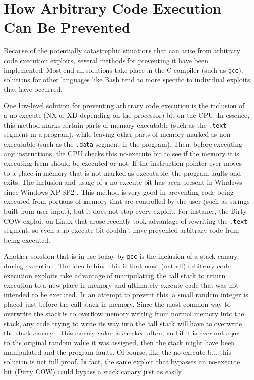 \section{How Arbitrary Code Execution Can Be Prevented}

Because of the potentially catastrophic situations that can arise from arbitrary code execution exploits, several methods for preventing it have been implemented. Most end-all solutions take place in the C compiler (such as \texttt{gcc}); solutions for other languages like Bash tend to more specific to individual exploits that have occurred.

One low-level solution for preventing arbitrary code execution is the inclusion of a no-execute (NX or XD depending on the processor) bit on the CPU. In essence, this method marks certain parts of memory executable (such as the \texttt{.text} segment in a program), while leaving other parts of memory marked as non-executable (such as the \texttt{.data} segment in the program). Then, before executing any instructions, the CPU checks this no-execute bit to see if the memory it is executing from should be executed or not. If the instruction pointer ever moves to a place in memory that is not marked as executable, the program faults and exits. The inclusion and usage of a no-execute bit has been present in Windows since Windows XP SP2 \cite{andersen_abella_2004}. This method is very good in preventing code being executed from portions of memory that are controlled by the user (such as strings built from user input), but it does not stop every exploit. For instance, the Dirty COW exploit on Linux that arose recently took advantage of rewriting the \texttt{.text} segment, so even a no-execute bit couldn’t have prevented arbitrary code from being executed.

Another solution that is in-use today by \texttt{gcc} is the inclusion of a stack canary during execution. The idea behind this is that most (not all) arbitrary code execution exploits take advantage of manipulating the call stack to return execution to a new place in memory and ultimately execute code that was not intended to be executed. In an attempt to prevent this, a small random integer is placed just before the call stack in memory. Since the most common way to overwrite the stack is to overflow memory writing from normal memory into the stack, any code trying to write its way into the call stack will have to overwrite the stack canary \cite{dowd_mcdonald_schuh_2006}. This canary value is checked often, and if it is ever not equal to the original random value it was assigned, then the stack might have been manipulated and the program faults. Of course, like the no-execute bit, this solution is not full proof. In fact, the same exploit that bypasses an no-execute bit (Dirty COW) could bypass a stack canary just as easily.

